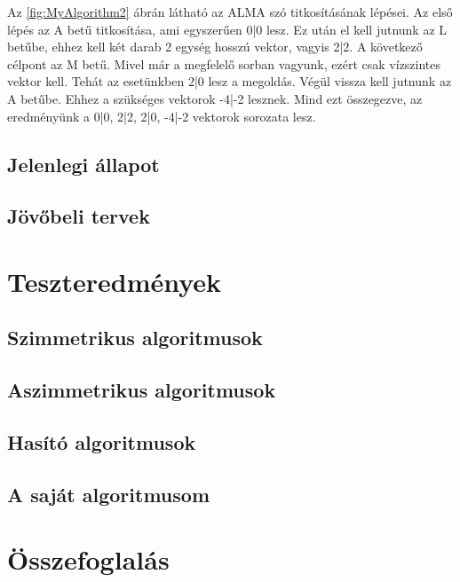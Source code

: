 \documentclass[12pt]{report} %
\begin{document}
Az \ref{fig:MyAlgorithm2} ábrán látható az ALMA szó titkosításának lépései. Az első lépés az A betű titkosítása, ami egyszerűen 0|0 lesz. Ez után el kell jutnunk az L betűbe, ehhez kell két darab 2 egység hosszú vektor, vagyis 2|2. A következő célpont az M betű. Mivel már a megfelelő sorban vagyunk, ezért csak vízszintes vektor kell. Tehát az esetünkben 2|0 lesz a megoldás. Végül vissza kell jutnunk az A betűbe. Ehhez a szükséges vektorok -4|-2 lesznek. Mind ezt összegezve, az eredményünk a 0|0, 2|2, 2|0, -4|-2 vektorok sorozata lesz.

\section{Jelenlegi állapot} %

\section{Jövőbeli tervek} %

\chapter{Teszteredmények} %

\section{Szimmetrikus algoritmusok} %

\section{Aszimmetrikus algoritmusok} %

\section{Hasító algoritmusok} %

\section{A saját algoritmusom} %

\chapter{Összefoglalás} %
\end{document}
